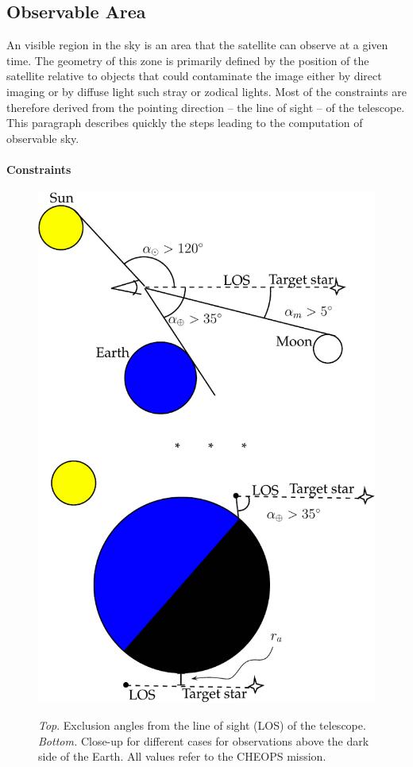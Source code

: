 \documentclass[a4paper,10pt]{article}
\begin{document}
\subsection{Observable Area} \label{sec:numerics-obs}
An visible region in the sky is an area that the satellite can observe at a given time. The geometry of this zone is primarily defined by the position of the satellite relative to objects that could contaminate the image either by direct imaging or by diffuse light such stray or zodical lights. Most of the constraints are therefore derived from the pointing direction -- the line of sight -- of the telescope. This paragraph describes quickly the steps leading to the computation of observable sky.
\paragraph{Constraints} \label{sec:numerics-visibility-constraints}
\begin{figure}
 \begin{center}
  \includegraphics[width=1\linewidth]{exclusion-angles}
    \caption{\emph{Top}. Exclusion angles from the line of sight (LOS) of the telescope. \emph{Bottom.} Close-up for different cases for observations above the dark side of the Earth. All values refer to the CHEOPS mission.}
    \vspace{-5em}
  \label{fig:exclusion-angles}
 \end{center}
\end{figure}
\end{document}
